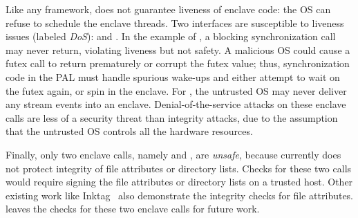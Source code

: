 Like any \sgx{} framework, \graphenesgx{} does not guarantee liveness of enclave code: the OS can refuse to schedule the enclave threads.
Two interfaces are susceptible to liveness issues (labeled {\em DoS}):  and .
In the example of , a blocking synchronization call may never return, violating liveness but not safety.
A malicious OS could cause a futex call to return prematurely or corrupt the futex value; thus, 
synchronization code in the PAL
must handle spurious wake-ups and either attempt to wait on the futex again, or spin in the enclave.
For , the untrusted OS may never deliver any stream events into an enclave.
Denial-of-the-service attacks on these enclave calls
are less of a security threat
than integrity attacks, due to the assumption that the untrusted OS controls all the hardware resources.

Finally, only two enclave calls, namely  and , are {\em unsafe}, because \graphenesgx{} currently does not protect
integrity of file attributes or directory lists.
Checks for these two calls would require signing the file attributes or directory lists
on a trusted host.
Other existing work like Inktag~\cite{inktag} also demonstrate the integrity checks for file attributes.
\graphenesgx{} leaves the checks for these two enclave calls
for future work.



 


